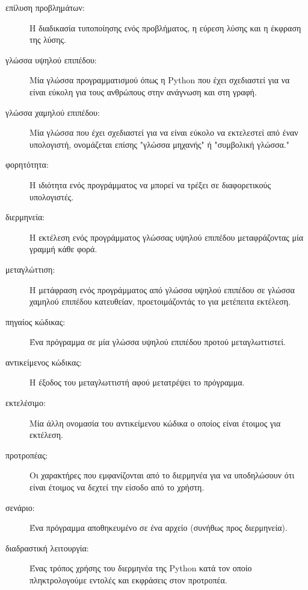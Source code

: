 \documentclass[10pt]{book}
\begin{document}
\begin{description}

\item[επίλυση προβλημάτων:]  Η διαδικασία τυποποίησης ενός προβλήματος,
	η εύρεση λύσης και η έκφραση της λύσης.

\item[γλώσσα υψηλού επιπέδου:]  Μία γλώσσα προγραμματισμού όπως η 
	Python  που έχει σχεδιαστεί για να είναι εύκολη για τους ανθρώπους
	στην ανάγνωση και στη γραφή.

\item[γλώσσα χαμηλού επιπέδου:]  Μία γλώσσα που έχει σχεδιαστεί για να είναι
	εύκολο να εκτελεστεί από έναν υπολογιστή, ονομάζεται επίσης "γλώσσα μηχανής" ή
	"συμβολική γλώσσα."

\item[φορητότητα:]  Η ιδιότητα ενός προγράμματος να μπορεί να τρέξει
	σε διαφορετικούς υπολογιστές.

\item[διερμηνεία:]  Η εκτέλεση ενός προγράμματος γλώσσας υψηλού επιπέδου
	μεταφράζοντας μία γραμμή κάθε φορά.

\item[μεταγλώττιση:]  Η μετάφραση ενός προγράμματος από γλώσσα 
    υψηλού επιπέδου σε γλώσσα χαμηλού επιπέδου κατευθείαν, 
    προετοιμάζοντάς το για μετέπειτα εκτέλεση.

\item[πηγαίος κώδικας:]  Ένα πρόγραμμα σε μία γλώσσα υψηλού επιπέδου
	προτού μεταγλωττιστεί.

\item[αντικείμενος κώδικας:]  Η έξοδος του μεταγλωττιστή αφού μετατρέψει
	το πρόγραμμα.

\item[εκτελέσιμο:]  Μία άλλη ονομασία του αντικείμενου κώδικα ο οποίος
	είναι έτοιμος για εκτέλεση.

\item[προτροπέας:] Οι χαρακτήρες που εμφανίζονται από το διερμηνέα για να 
	υποδηλώσουν ότι είναι έτοιμος να δεχτεί την είσοδο από το χρήστη.

\item[σενάριο:] Ένα πρόγραμμα αποθηκευμένο σε ένα αρχείο (συνήθως προς
	διερμηνεία).

\item[διαδραστική λειτουργία:] Ένας τρόπος χρήσης του διερμηνέα της
	 Python κατά τον οποίο πληκτρολογούμε εντολές και εκφράσεις στον προτροπέα.


\end{description}
\end{document}
